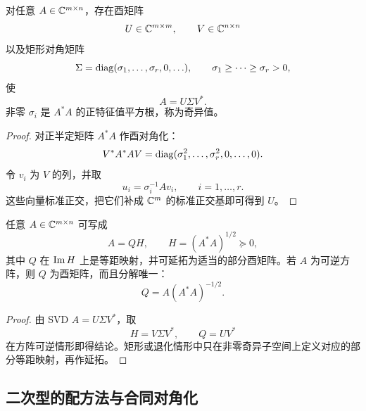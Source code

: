 \begin{theorem}[奇异值分解]
对任意 $A\in\mathbb C^{m\times n}$，存在酉矩阵
\begin{equation}
 U\in\mathbb C^{m\times m},
 \qquad V\in\mathbb C^{n\times n}
\end{equation}
以及矩形对角矩阵
\begin{equation}
 \Sigma=\operatorname{diag}(\sigma_1,\ldots,\sigma_r,0,\ldots),
 \qquad
 \sigma_1\geq\cdots\geq\sigma_r>0,
\end{equation}
使
\begin{equation}
 A=U\Sigma V^*.
\end{equation}
非零 $\sigma_i$ 是 $A^*A$ 的正特征值平方根，称为奇异值。
\end{theorem}

\begin{proof}
对正半定矩阵 $A^*A$ 作酉对角化：
\begin{equation}
 V^*A^*AV=\operatorname{diag}(\sigma_1^2,\ldots,\sigma_r^2,0,\ldots,0).
\end{equation}
令 $v_i$ 为 $V$ 的列，并取
\begin{equation}
 u_i=\sigma_i^{-1}Av_i,
 \qquad i=1,\ldots,r.
\end{equation}
这些向量标准正交，把它们补成 $\mathbb C^m$ 的标准正交基即可得到 $U$。
\end{proof}

\begin{theorem}[极分解]
任意 $A\in\mathbb C^{m\times n}$ 可写成
\begin{equation}
 A=QH,
 \qquad
 H=(A^*A)^{1/2}\succeq0,
\end{equation}
其中 $Q$ 在 $\operatorname{Im} H$ 上是等距映射，并可延拓为适当的部分酉矩阵。若 $A$ 为可逆方阵，则 $Q$ 为酉矩阵，而且分解唯一：
\begin{equation}
 Q=A(A^*A)^{-1/2}.
\end{equation}
\end{theorem}

\begin{proof}
由 SVD $A=U\Sigma V^*$，取
\begin{equation}
 H=V\Sigma V^*,
 \qquad
 Q=UV^*
\end{equation}
在方阵可逆情形即得结论。矩形或退化情形中只在非零奇异子空间上定义对应的部分等距映射，再作延拓。
\end{proof}

\subsection{二次型的配方法与合同对角化}


